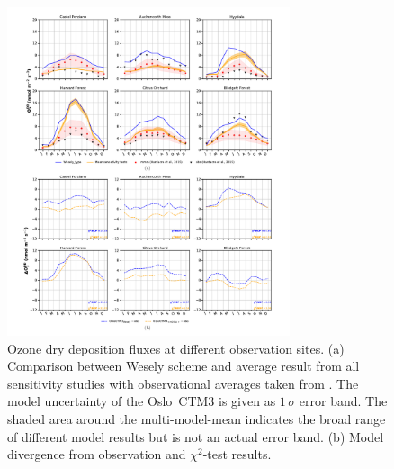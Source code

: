 \documentclass[gmd, manuscript]{copernicus}
\providecommand{\DIFaddbeginFL}{} %
\providecommand{\DIFaddendFL}{} %
\providecommand{\DIFdelbeginFL}{} %
\providecommand{\DIFdelendFL}{} %
\begin{document}
%
\begin{figure}[t]
  \DIFdelbeginFL %
\DIFdelendFL \DIFaddbeginFL \includegraphics[width=8.3cm]{fig09}
  \DIFaddendFL \caption{Ozone dry deposition fluxes at different observation sites. (a) Comparison between Wesely scheme and average result from all sensitivity studies with observational averages taken from \citet{ACP:Hardacre2015}. The model uncertainty of the Oslo~CTM3 is given as $1\,\sigma$ error band. The shaded area around the multi-model-mean indicates the broad range of different model results but is not an actual error band. (b) Model divergence from observation and $\chi^2$-test results.}
  \label{fig:mmm_drydep_stations}
\end{figure}
\end{document}
